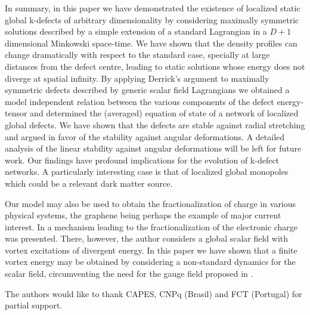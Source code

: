 \documentclass[prd,twocolumn,a4paper,superscriptaddress,floatfix]{revtex4}
\begin{document}
In summary, in this paper we have demonstrated the existence of localized static global k-defects of arbitrary dimensionality by considering maximally symmetric solutions described by a simple extension of a standard Lagrangian in a $D+1$ dimensional Minkowski space-time. We have shown that the density profiles can change dramatically with respect to the standard case, specially at large distances from the defect centre, leading to static solutions whose energy does not diverge at spatial infinity. By applying Derrick's argument to maximally symmetric defects described by generic scalar field Lagrangians we obtained a model independent relation between the various components of the defect energy-tensor and determined the (averaged) equation of state of a network of localized global defects. 
We have shown that the defects are stable against radial stretching and argued in favor of the stability against angular deformations. A detailed analysis of the linear stability against angular deformations will be left for future work. Our findings have profound implications for the evolution of k-defect networks. A particularly interesting case is that of localized global monopoles which could be a relevant dark matter source.

Our model may also be used to obtain the fractionalization of charge in various physical systems, the graphene being perhaps the example of major current interest. In \cite{chamon} a mechanism leading to the fractionalization of  the electronic charge was presented. There, however, the author considers a global scalar field with vortex excitations of divergent energy. In this paper we have shown that a finite vortex energy may be obtained by considering a non-standard dynamics for the scalar field, circumventing the need for the gauge field proposed in \cite{jackiw}.


\begin{acknowledgments}

The authors would like to thank CAPES, CNPq (Brasil) and FCT (Portugal) for partial support.

\end{acknowledgments}



\end{document}
